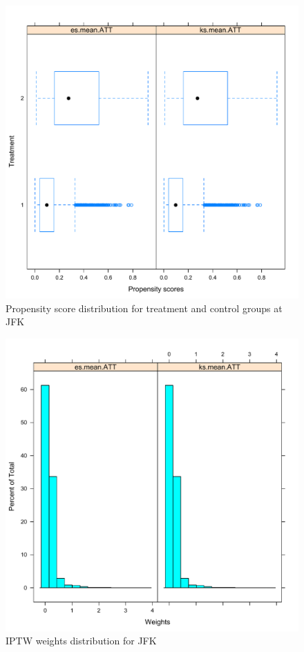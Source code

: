 \documentclass[11pt]{scrartcl}
\begin{document}
\begin{figure}[h!]
\includegraphics[width=\textwidth]{./figs/taf_jfk_twang_boxplot_pscores.pdf}
\caption{Propensity score distribution for treatment and control groups at JFK}
\label{fig:sil}
\end{figure}

\begin{figure}[h!]
\includegraphics[width=\textwidth]{./figs/taf_jfk_twang_hist_weights.pdf}
\caption{IPTW weights distribution for JFK}
\label{fig:sil}
\end{figure}
\end{document}
